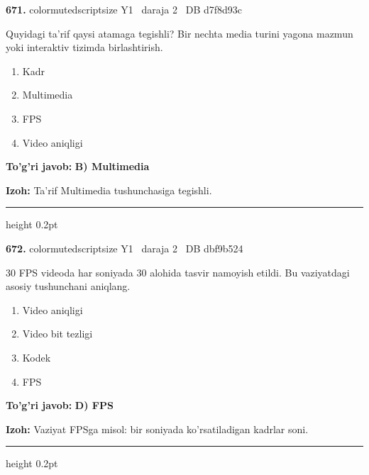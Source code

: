 \documentclass[10pt,a4paper,oneside]{article}
\begin{document}
\noindent\textbf{\color{ink}671.}  {color{muted}scriptsize Y1 \textbullet\ daraja 2 \textbullet\ DB d7f8d93c}
\par
Quyidagi ta'rif qaysi atamaga tegishli? Bir nechta media turini yagona mazmun yoki interaktiv tizimda birlashtirish.
\begin{enumerate}[label=\Alph*),leftmargin=9mm]
\item Kadr
\item Multimedia
\item FPS
\item Video aniqligi
\end{enumerate}
\begin{tcolorbox}[enhanced,breakable,colback=teal!4,colframe=teal!50!black,boxrule=0.5pt,arc=1.1mm,left=3mm,right=3mm,top=1.7mm,bottom=1.7mm,before skip=2mm,after skip=2mm]
\textbf{\color{teal}To'g'ri javob:} \textbf{B) Multimedia}
\par\smallskip
\textbf{Izoh:} Ta'rif Multimedia tushunchasiga tegishli.
\end{tcolorbox}
\vspace{2mm}\hrule height 0.2pt \vspace{3mm}

\noindent\textbf{\color{ink}672.}  {color{muted}scriptsize Y1 \textbullet\ daraja 2 \textbullet\ DB dbf9b524}
\par
30 FPS videoda har soniyada 30 alohida tasvir namoyish etildi. Bu vaziyatdagi asosiy tushunchani aniqlang.
\begin{enumerate}[label=\Alph*),leftmargin=9mm]
\item Video aniqligi
\item Video bit tezligi
\item Kodek
\item FPS
\end{enumerate}
\begin{tcolorbox}[enhanced,breakable,colback=teal!4,colframe=teal!50!black,boxrule=0.5pt,arc=1.1mm,left=3mm,right=3mm,top=1.7mm,bottom=1.7mm,before skip=2mm,after skip=2mm]
\textbf{\color{teal}To'g'ri javob:} \textbf{D) FPS}
\par\smallskip
\textbf{Izoh:} Vaziyat FPSga misol: bir soniyada ko'rsatiladigan kadrlar soni.
\end{tcolorbox}
\vspace{2mm}\hrule height 0.2pt \vspace{3mm}
\end{document}
